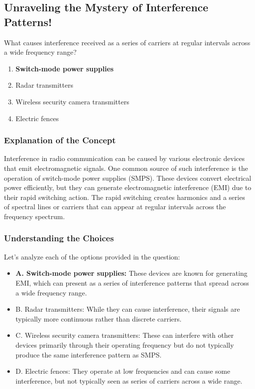 \subsection{Unraveling the Mystery of Interference Patterns!}

\begin{tcolorbox}[colback=gray!10, colframe=black, title=E4E12] What causes interference received as a series of carriers at regular intervals across a wide frequency range?
\begin{enumerate}[label=\Alph*.]
    \item \textbf{Switch-mode power supplies}
    \item Radar transmitters
    \item Wireless security camera transmitters
    \item Electric fences
\end{enumerate} \end{tcolorbox}

\subsubsection{Explanation of the Concept}

Interference in radio communication can be caused by various electronic devices that emit electromagnetic signals. One common source of such interference is the operation of switch-mode power supplies (SMPS). These devices convert electrical power efficiently, but they can generate electromagnetic interference (EMI) due to their rapid switching action. The rapid switching creates harmonics and a series of spectral lines or carriers that can appear at regular intervals across the frequency spectrum.

\subsubsection{Understanding the Choices}

Let's analyze each of the options provided in the question:
\begin{itemize}
    \item \textbf{A. Switch-mode power supplies:} These devices are known for generating EMI, which can present as a series of interference patterns that spread across a wide frequency range.
    \item B. Radar transmitters: While they can cause interference, their signals are typically more continuous rather than discrete carriers.
    \item C. Wireless security camera transmitters: These can interfere with other devices primarily through their operating frequency but do not typically produce the same interference pattern as SMPS.
    \item D. Electric fences: They operate at low frequencies and can cause some interference, but not typically seen as series of carriers across a wide range.
\end{itemize}

